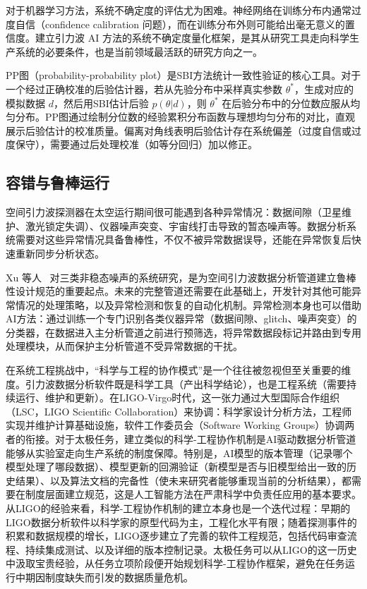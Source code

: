 对于机器学习方法，系统不确定度的评估尤为困难。神经网络在训练分布内通常过度自信（confidence calibration 问题），而在训练分布外则可能给出毫无意义的置信度。建立引力波 AI 方法的系统不确定度量化框架，是其从研究工具走向科学生产系统的必要条件，也是当前领域最活跃的研究方向之一。

PP图（probability-probability plot）是SBI方法统计一致性验证的核心工具。对于一个经过正确校准的后验估计器，若从先验分布中采样真实参数 $\theta^*$，生成对应的模拟数据 $d$，然后用SBI估计后验 $p(\theta|d)$，则 $\theta^*$ 在后验分布中的分位数应服从均匀分布。PP图通过绘制分位数的经验累积分布函数与理想均匀分布的对比，直观展示后验估计的校准质量。偏离对角线表明后验估计存在系统偏差（过度自信或过度保守），需要通过后处理校准（如等分回归）加以修正。

\subsection{容错与鲁棒运行}

空间引力波探测器在太空运行期间很可能遇到各种异常情况：数据间隙（卫星维护、激光锁定失调）、仪器噪声突变、宇宙线打击导致的暂态噪声等。数据分析系统需要对这些异常情况具备鲁棒性，不仅不被异常数据误导，还能在异常恢复后快速重新同步分析状态。

Xu 等人~\cite{xu2024nonstationarty} 对三类非稳态噪声的系统研究，是为空间引力波数据分析管道建立鲁棒性设计规范的重要起点。未来的完整管道还需要在此基础上，开发针对其他可能异常情况的处理策略，以及异常检测和恢复的自动化机制。异常检测本身也可以借助AI方法：通过训练一个专门识别各类仪器异常（数据间隙、glitch、噪声突变）的分类器，在数据进入主分析管道之前进行预筛选，将异常数据段标记并路由到专用处理模块，从而保护主分析管道不受异常数据的干扰。

在系统工程挑战中，“科学与工程的协作模式”是一个往往被忽视但至关重要的维度。引力波数据分析软件既是科学工具（产出科学结论），也是工程系统（需要持续运行、维护和更新）。在LIGO-Virgo时代，这一张力通过大型国际合作组织（LSC，LIGO Scientific Collaboration）来协调：科学家设计分析方法，工程师实现并维护计算基础设施，软件工作委员会（Software Working Groups）协调两者的衔接。对于太极任务，建立类似的科学-工程协作机制是AI驱动数据分析管道能够从实验室走向生产系统的制度保障。特别是，AI模型的版本管理（记录哪个模型处理了哪段数据）、模型更新的回溯验证（新模型是否与旧模型给出一致的历史结果）、以及算法文档的完备性（使未来研究者能够重现当前的分析结果），都需要在制度层面建立规范，这是人工智能方法在严肃科学中负责任应用的基本要求。从LIGO的经验来看，科学-工程协作机制的建立本身也是一个迭代过程：早期的LIGO数据分析软件以科学家的原型代码为主，工程化水平有限；随着探测事件的积累和数据规模的增长，LIGO逐步建立了完善的软件工程规范，包括代码审查流程、持续集成测试、以及详细的版本控制记录。太极任务可以从LIGO的这一历史中汲取宝贵经验，从任务立项阶段便开始规划科学-工程协作框架，避免在任务运行中期因制度缺失而引发的数据质量危机。

